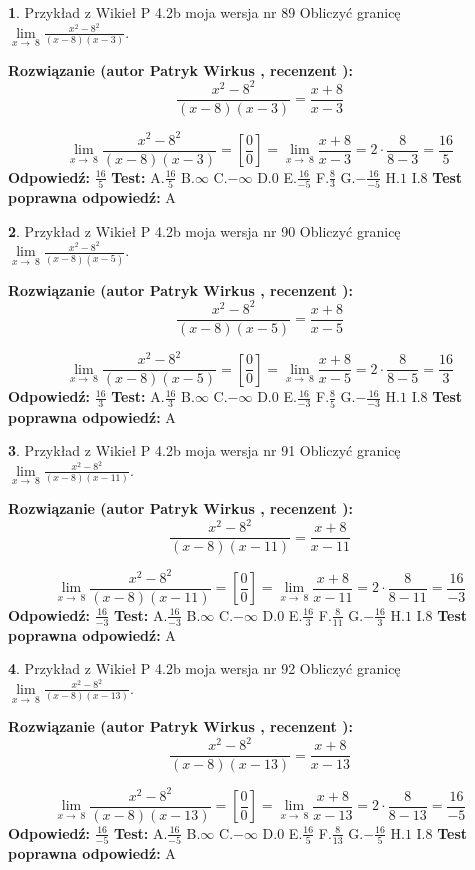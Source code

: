 \documentclass[12pt, a4paper]{article}
\theoremstyle{definition} %
\newtheorem{zad}{}
\newcommand{\zadStart}[1]{\begin{zad}#1\newline}
\newcommand{\zadStop}{\end{zad}}
\newcommand{\rozwStart}[2]{\noindent \textbf{Rozwiązanie (autor #1 , recenzent #2): }\newline}
\newcommand{\rozwStop}{\newline}
\newcommand{\odpStart}{\noindent \textbf{Odpowiedź:}\newline}
\newcommand{\odpStop}{\newline}
\newcommand{\testStart}{\noindent \textbf{Test:}\newline}
\newcommand{\testStop}{\newline}
\newcommand{\kluczStart}{\noindent \textbf{Test poprawna odpowiedź:}\newline}
\newcommand{\kluczStop}{\newline}
\begin{document}
\zadStart{Przykład z Wikieł P 4.2b moja wersja nr 89}
Obliczyć granicę $\lim\limits_{x\to\ 8}\frac{x^{2}-8^{2}}{(x-8)(x-3)}$.
\zadStop
\rozwStart{Patryk Wirkus}{}
$$\frac{x^{2}-8^{2}}{(x-8)(x-3)}=\frac{x+8}{x-3}$$

$$\lim\limits_{x\to\ 8}\frac{x^{2}-8^{2}}{(x-8)(x-3)}=[\frac{0}{0}]=\lim\limits_{x\to\ 8}\frac{x+8}{x-3}=2 \cdot \frac{8}{8-3} = \frac{16}{5}$$
\rozwStop
\odpStart
$\frac{16}{5}$
\odpStop
\testStart
A.$\frac{16}{5}$
B.$\infty$
C.$-\infty$
D.$0$
E.$\frac{16}{-5}$
F.$\frac{8}{3}$
G.$-\frac{16}{-5}$
H.$1$
I.$8$
\testStop
\kluczStart
A
\kluczStop



\zadStart{Przykład z Wikieł P 4.2b moja wersja nr 90}
Obliczyć granicę $\lim\limits_{x\to\ 8}\frac{x^{2}-8^{2}}{(x-8)(x-5)}$.
\zadStop
\rozwStart{Patryk Wirkus}{}
$$\frac{x^{2}-8^{2}}{(x-8)(x-5)}=\frac{x+8}{x-5}$$

$$\lim\limits_{x\to\ 8}\frac{x^{2}-8^{2}}{(x-8)(x-5)}=[\frac{0}{0}]=\lim\limits_{x\to\ 8}\frac{x+8}{x-5}=2 \cdot \frac{8}{8-5} = \frac{16}{3}$$
\rozwStop
\odpStart
$\frac{16}{3}$
\odpStop
\testStart
A.$\frac{16}{3}$
B.$\infty$
C.$-\infty$
D.$0$
E.$\frac{16}{-3}$
F.$\frac{8}{5}$
G.$-\frac{16}{-3}$
H.$1$
I.$8$
\testStop
\kluczStart
A
\kluczStop



\zadStart{Przykład z Wikieł P 4.2b moja wersja nr 91}
Obliczyć granicę $\lim\limits_{x\to\ 8}\frac{x^{2}-8^{2}}{(x-8)(x-11)}$.
\zadStop
\rozwStart{Patryk Wirkus}{}
$$\frac{x^{2}-8^{2}}{(x-8)(x-11)}=\frac{x+8}{x-11}$$

$$\lim\limits_{x\to\ 8}\frac{x^{2}-8^{2}}{(x-8)(x-11)}=[\frac{0}{0}]=\lim\limits_{x\to\ 8}\frac{x+8}{x-11}=2 \cdot \frac{8}{8-11} = \frac{16}{-3}$$
\rozwStop
\odpStart
$\frac{16}{-3}$
\odpStop
\testStart
A.$\frac{16}{-3}$
B.$\infty$
C.$-\infty$
D.$0$
E.$\frac{16}{3}$
F.$\frac{8}{11}$
G.$-\frac{16}{3}$
H.$1$
I.$8$
\testStop
\kluczStart
A
\kluczStop



\zadStart{Przykład z Wikieł P 4.2b moja wersja nr 92}
Obliczyć granicę $\lim\limits_{x\to\ 8}\frac{x^{2}-8^{2}}{(x-8)(x-13)}$.
\zadStop
\rozwStart{Patryk Wirkus}{}
$$\frac{x^{2}-8^{2}}{(x-8)(x-13)}=\frac{x+8}{x-13}$$

$$\lim\limits_{x\to\ 8}\frac{x^{2}-8^{2}}{(x-8)(x-13)}=[\frac{0}{0}]=\lim\limits_{x\to\ 8}\frac{x+8}{x-13}=2 \cdot \frac{8}{8-13} = \frac{16}{-5}$$
\rozwStop
\odpStart
$\frac{16}{-5}$
\odpStop
\testStart
A.$\frac{16}{-5}$
B.$\infty$
C.$-\infty$
D.$0$
E.$\frac{16}{5}$
F.$\frac{8}{13}$
G.$-\frac{16}{5}$
H.$1$
I.$8$
\testStop
\kluczStart
A
\kluczStop
\end{document}
